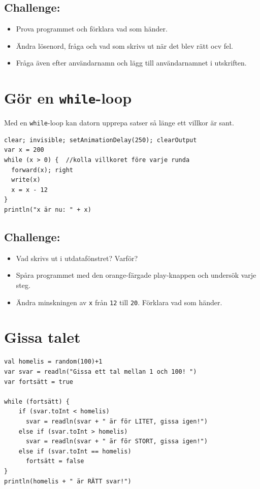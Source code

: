 \section*{\color{BrickRed}Challenge:}


\begin{itemize}

\item {Prova programmet och förklara vad som händer.}
\item {Ändra lösenord, fråga och vad som skrivs ut när det blev rätt ocv fel.}
\item {Fråga även efter användarnamn och lägg till användarnamnet i utskriften.}

\end{itemize}


\chapter{Gör en \lstinline{while}-loop}Med en \lstinline{while}-loop kan datorn upprepa satser så länge ett villkor är sant.

\begin{lstlisting}[basicstyle={\ttfamily\fontsize{22}{27}\selectfont},numbers=none]
clear; invisible; setAnimationDelay(250); clearOutput
var x = 200
while (x > 0) {  //kolla villkoret före varje runda 
  forward(x); right
  write(x) 
  x = x - 12
}
println("x är nu: " + x)
\end{lstlisting}
        
\section*{\color{BrickRed}Challenge:}


\begin{itemize}

\item {Vad skrivs ut i utdatafönstret? Varför?}
\item {Spåra programmet med den orange-färgade play-knappen och undersök varje steg.}
\item {Ändra minskningen av \lstinline{x} från \lstinline{12} till \lstinline{20}. Förklara vad som händer.}

\end{itemize}


\chapter{Gissa talet}
\begin{lstlisting}[basicstyle={\ttfamily\fontsize{16}{19}\selectfont},numbers=none]
val homelis = random(100)+1
var svar = readln("Gissa ett tal mellan 1 och 100! ")
var fortsätt = true

while (fortsätt) {
    if (svar.toInt < homelis)
      svar = readln(svar + " är för LITET, gissa igen!")
    else if (svar.toInt > homelis)
      svar = readln(svar + " är för STORT, gissa igen!")
    else if (svar.toInt == homelis)
      fortsätt = false
}
println(homelis + " är RÄTT svar!")
\end{lstlisting}
        
